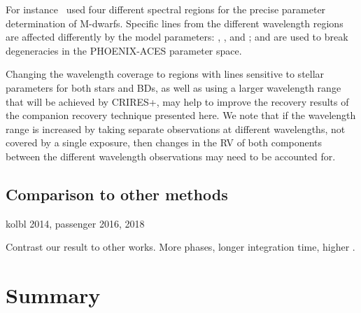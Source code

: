 For instance~\citet{passegger_fundamental_2016} used four different spectral regions for the precise parameter determination of M-dwarfs.
Specific lines from the different wavelength regions are affected differently by the model parameters: \Teff{}, \logg{}, and \feh{}; and are used to break degeneracies in the {PHOENIX-ACES} parameter space.

Changing the wavelength coverage to regions with lines sensitive to stellar parameters for both stars and BDs, as well as using a larger wavelength range that will be achieved by {CRIRES+}, may help to improve the recovery results of the companion recovery technique presented here.
We note that if the wavelength range is increased by taking separate observations at different wavelengths, not covered by a single exposure, then changes in the {RV} of both components between the different wavelength observations may need to be accounted for.



\subsection{Comparison to other methods}
kolbl 2014, passenger 2016, 2018

Contrast our result to other works.  More phases, longer integration time, higher {\snr{}}.



\section{Summary}
